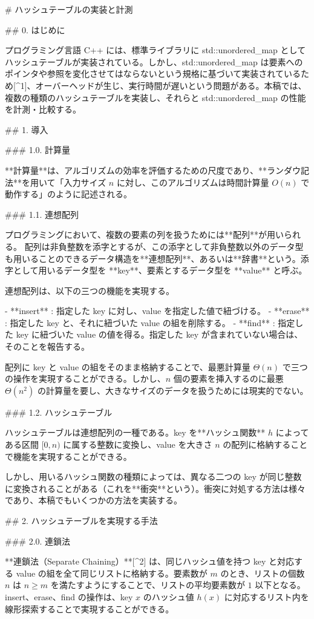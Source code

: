 # ハッシュテーブルの実装と計測

## 0. はじめに

プログラミング言語 C++ には、標準ライブラリに std::unordered_map としてハッシュテーブルが実装されている。しかし、std::unordered_map は要素へのポインタや参照を変化させてはならないという規格に基づいて実装されているため[^1]、オーバーヘッドが生じ、実行時間が遅いという問題がある。本稿では、複数の種類のハッシュテーブルを実装し、それらと std::unordered_map の性能を計測・比較する。

## 1. 導入

### 1.0. 計算量

**計算量**は、アルゴリズムの効率を評価するための尺度であり、**ランダウ記法**を用いて「入力サイズ $n$ に対し、このアルゴリズムは時間計算量 $O(n)$ で動作する」のように記述される。

### 1.1. 連想配列

プログラミングにおいて、複数の要素の列を扱うためには**配列**が用いられる。
配列は非負整数を添字とするが、この添字として非負整数以外のデータ型も用いることのできるデータ構造を**連想配列**、あるいは**辞書**という。添字として用いるデータ型を **key**、要素とするデータ型を **value** と呼ぶ。

連想配列は、以下の三つの機能を実現する。

- **insert** : 指定した key に対し、value を指定した値で紐づける。
- **erase** : 指定した key と、それに紐づいた value の組を削除する。
- **find** : 指定した key に紐づいた value の値を得る。指定した key が含まれていない場合は、そのことを報告する。

配列に key と value の組をそのまま格納することで、最悪計算量 $\Theta (n)$ で三つの操作を実現することができる。しかし、$n$ 個の要素を挿入するのに最悪 $\Theta (n^2)$ の計算量を要し、大きなサイズのデータを扱うためには現実的でない。

### 1.2. ハッシュテーブル

ハッシュテーブルは連想配列の一種である。key を**ハッシュ関数** $h$ によってある区間 $[0, n)$ に属する整数に変換し、value を大きさ $n$ の配列に格納することで機能を実現することができる。

しかし、用いるハッシュ関数の種類によっては、異なる二つの key が同じ整数に変換されることがある（これを**衝突**という）。衝突に対処する方法は様々であり、本稿でもいくつかの方法を実装する。

## 2. ハッシュテーブルを実現する手法

### 2.0. 連鎖法

**連鎖法（Separate Chaining）**[^2] は、同じハッシュ値を持つ key と対応する value の組を全て同じリストに格納する。要素数が $m$ のとき、リストの個数 $n$ は $n \geq m$ を満たすようにすることで、リストの平均要素数が $1$ 以下となる。insert、erase、find の操作は、key $x$ のハッシュ値 $h(x)$ に対応するリスト内を線形探索することで実現することができる。


